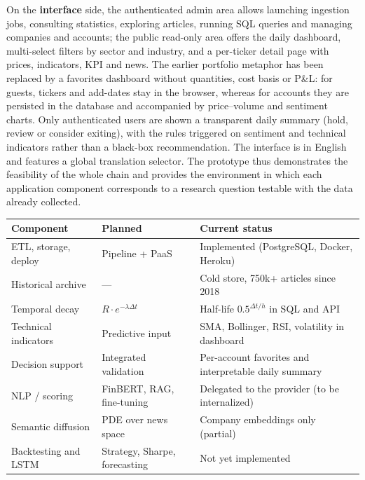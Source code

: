 \documentclass[a4paper,11pt]{article}
\begin{document}
On the \textbf{interface} side, the authenticated admin area allows launching ingestion jobs, consulting statistics, exploring articles, running SQL queries and managing companies and accounts; the public read-only area offers the daily dashboard, multi-select filters by sector and industry, and a per-ticker detail page with prices, indicators, KPI and news. The earlier portfolio metaphor has been replaced by a favorites dashboard without quantities, cost basis or P\&L: for guests, tickers and add-dates stay in the browser, whereas for accounts they are persisted in the database and accompanied by price--volume and sentiment charts. Only authenticated users are shown a transparent daily summary (hold, review or consider exiting), with the rules triggered on sentiment and technical indicators rather than a black-box recommendation. The interface is in English and features a global translation selector. The prototype thus demonstrates the feasibility of the whole chain and provides the environment in which each application component corresponds to a research question testable with the data already collected.

\begin{table}[H]
\centering
\renewcommand{\arraystretch}{1.2}
\small
\begin{tabular}{|p{4.6cm}|p{3.4cm}|p{5.6cm}|}
\hline
\textbf{Component} & \textbf{Planned} & \textbf{Current status} \\
\hline
ETL, storage, deploy & Pipeline + PaaS & Implemented (PostgreSQL, Docker, Heroku) \\
\hline
Historical archive & --- & Cold store, 750k+ articles since 2018 \\
\hline
Temporal decay & $R\cdot e^{-\lambda\Delta t}$ & Half-life $0.5^{\Delta t/h}$ in SQL and API \\
\hline
Technical indicators & Predictive input & SMA, Bollinger, RSI, volatility in dashboard \\
\hline
Decision support & Integrated validation & Per-account favorites and interpretable daily summary \\
\hline
NLP / scoring & FinBERT, RAG, fine-tuning & Delegated to the provider (to be internalized) \\
\hline
Semantic diffusion & PDE over news space & Company embeddings only (partial) \\
\hline
Backtesting and LSTM & Strategy, Sharpe, forecasting & Not yet implemented \\
\hline
\end{tabular}
\end{table}
\end{document}
